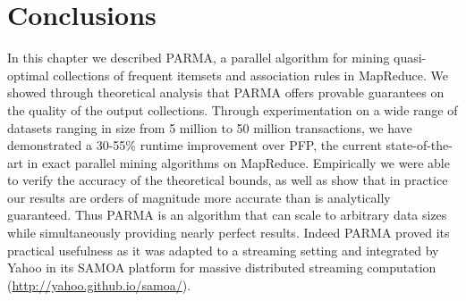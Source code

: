 \section{Conclusions}
\label{sec:parmaconc}

In this chapter we described PARMA, a parallel algorithm for mining
quasi-optimal collections of frequent itemsets and association rules in MapReduce.
We showed through theoretical analysis that PARMA offers provable guarantees on
the quality of the output collections. Through experimentation on a wide range
of datasets ranging in size from 5 million to 50 million transactions,
we have demonstrated a 30-55\% runtime improvement over PFP, the
current state-of-the-art in exact parallel mining algorithms on MapReduce.
Empirically we were able to verify the accuracy of the theoretical bounds, as
well as show that in practice our results are orders of magnitude more accurate
than is analytically guaranteed. Thus PARMA is an algorithm that can scale to
arbitrary data sizes while simultaneously providing nearly perfect results.
Indeed PARMA proved its practical usefulness as it was adapted to a streaming
setting and integrated by Yahoo in its SAMOA platform for massive distributed
streaming computation (\url{http://yahoo.github.io/samoa/}).
